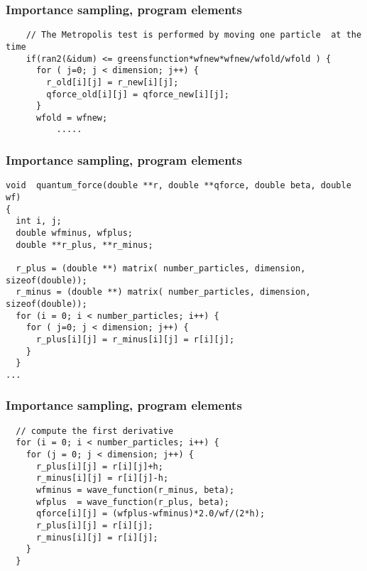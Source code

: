 \documentclass{beamer}
\begin{document}
\begin{frame}
\frametitle{Importance sampling, program elements}

\begin{block}{}
\begin{verbatim}
 	// The Metropolis test is performed by moving one particle  at the time
	if(ran2(&idum) <= greensfunction*wfnew*wfnew/wfold/wfold ) { 
	  for ( j=0; j < dimension; j++) {
	    r_old[i][j] = r_new[i][j];
	    qforce_old[i][j] = qforce_new[i][j];
	  }
	  wfold = wfnew;
          .....
\end{verbatim}
\end{block}
\end{frame}

\begin{frame}
\frametitle{Importance sampling, program elements}

\begin{block}{}
\begin{verbatim}
void  quantum_force(double **r, double **qforce, double beta, double wf)
{
  int i, j;
  double wfminus, wfplus; 
  double **r_plus, **r_minus;

  r_plus = (double **) matrix( number_particles, dimension, sizeof(double));
  r_minus = (double **) matrix( number_particles, dimension, sizeof(double));
  for (i = 0; i < number_particles; i++) { 
    for ( j=0; j < dimension; j++) {
      r_plus[i][j] = r_minus[i][j] = r[i][j];
    }
  }
...
\end{verbatim}
\end{block}
\end{frame}

\begin{frame}
\frametitle{Importance sampling, program elements}

\begin{block}{}
\begin{verbatim}
  // compute the first derivative
  for (i = 0; i < number_particles; i++) {
    for (j = 0; j < dimension; j++) { 
      r_plus[i][j] = r[i][j]+h;
      r_minus[i][j] = r[i][j]-h;
      wfminus = wave_function(r_minus, beta); 
      wfplus  = wave_function(r_plus, beta); 
      qforce[i][j] = (wfplus-wfminus)*2.0/wf/(2*h);
      r_plus[i][j] = r[i][j];
      r_minus[i][j] = r[i][j];
    }
  }
\end{verbatim}
\end{block}
\end{frame}
\end{document}
